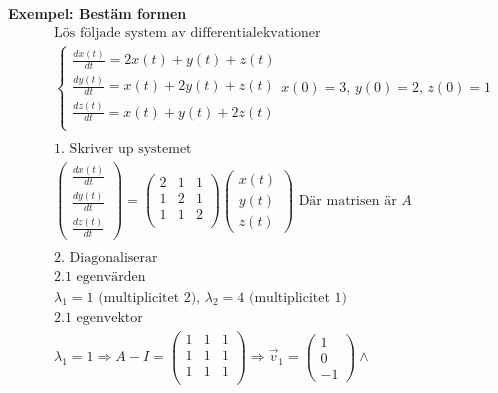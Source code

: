 \textbf{Exempel: Bestäm formen}
\begin{align*}
  &\quad  \text{Lös följade system av differentialekvationer} \\
  &\quad
  \left\{\begin{array}{rrr}
  \frac{dx(t)}{dt} = 2x(t) + y(t) + z(t) \\
  \frac{dy(t)}{dt} =  x(t) +2y(t) + z(t) \\
  \frac{dz(t)}{dt} =  x(t) + y(t) +2z(t) \\
  \end{array}\right. x (0) =3, \, y (0) =2, \, z (0) =1  \\
  &\quad  \\
  &\quad  \text{1. Skriver up systemet} \\
  &\quad
  \begin{pmatrix} \frac{dx (t)}{dt} \\ \frac{dy (t)}{dt} \\ \frac{dz (t)}{dt} \end{pmatrix} =
  \left(\begin{array}{ccc}
    2 & 1 & 1 \\
    1 & 2 & 1 \\
    1 & 1 & 2 \\
  \end{array}\right)
  \begin{pmatrix} x (t) \\ y (t) \\ z (t)  \end{pmatrix}  \text{ Där matrisen är $A$} \\
  &\quad  \\
  &\quad  \text{2. Diagonaliserar} \\
  &\quad  \text{2.1 egenvärden} \\
  &\quad  \lambda_1 = 1 \text{ (multiplicitet 2), } \lambda_2 = 4 \text{ (multiplicitet 1) } \\
  &\quad  \text{2.1 egenvektor} \\
  &\quad  \lambda_1 = 1 \Rightarrow{}  A -I =
  \left(\begin{array}{ccc}
    1 & 1 & 1 \\
    1 & 1 & 1 \\
    1 & 1 & 1 \\
  \end{array}\right)  \Rightarrow{}
  \vec{v}_1 = \begin{pmatrix} 1 \\ 0 \\ -1  \end{pmatrix} \land{}

\end{align*}
